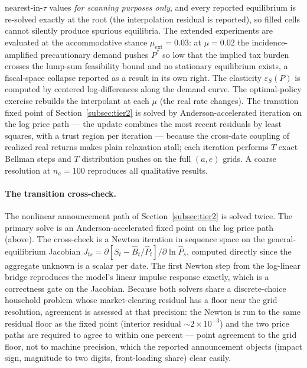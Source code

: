 \documentclass[12pt]{article}
\newcommand{\Sfun}{S}
\begin{document}
nearest-in-$\tau$ values \emph{for scanning purposes only}, and every reported
equilibrium is re-solved exactly at the root (the interpolation residual is
reported), so filled cells cannot silently produce spurious equilibria. The
extended experiments are evaluated at the accommodative stance
$\mu_{\mathrm{ext}}=0.03$: at $\mu=0.02$ the incidence-amplified precautionary
demand pushes $P^{*}$ so low that the implied tax burden crosses the lump-sum
feasibility bound and no stationary equilibrium exists, a fiscal-space
collapse reported as a result in its own right. The elasticity
$\varepsilon_S(P)$ is computed by centered log-differences along the demand
curve. The optimal-policy exercise rebuilds the interpolant at each $\mu$
(the real rate changes). The transition fixed point of
Section~\ref{subsec:tier2} is solved by Anderson-accelerated iteration on
the log price path --- the update combines the most recent residuals by
least squares, with a trust region per iteration --- because the cross-date
coupling of realized real returns makes plain relaxation stall; each
iteration performs $T$ exact Bellman steps and $T$ distribution pushes on
the full $(a,e)$ grids. A coarse resolution at $n_a=100$ reproduces all
qualitative results.

\paragraph{The transition cross-check.} The nonlinear announcement path of
Section~\ref{subsec:tier2} is solved twice. The primary solve is an
Anderson-accelerated fixed point on the log price path (above). The
cross-check is a Newton iteration in sequence space on the
general-equilibrium Jacobian
$J_{ts}=\partial[\Sfun_t-\hat B_t/\hat P_t]/\partial\ln\hat P_s$, computed
directly since the aggregate unknown is a scalar per date. The first Newton
step from the log-linear bridge reproduces the model's linear impulse
response exactly, which is a correctness gate on the Jacobian. Because both
solvers share a discrete-choice household problem whose market-clearing
residual has a floor near the grid resolution, agreement is assessed at that
precision: the Newton is run to the same residual floor as the fixed point
(interior residual $\sim2\times10^{-3}$) and the two price paths are
required to agree to within one percent --- point agreement to the grid
floor, not to machine precision, which the reported announcement objects
(impact sign, magnitude to two digits, front-loading share) clear easily.
\end{document}
